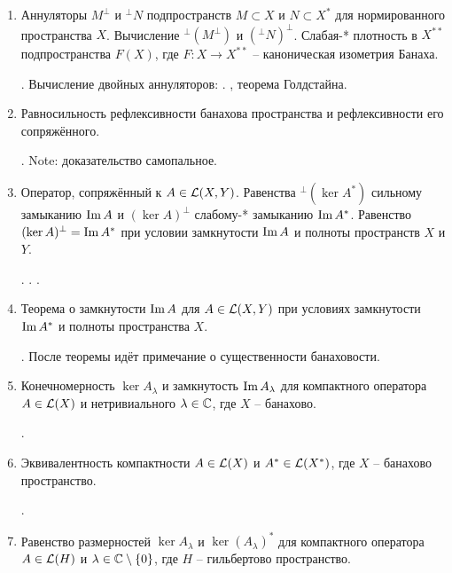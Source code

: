 \begin{enumerate}
     <<>>.

    . Note: доказательство самопальное, в лекциях есть каноническое (конец 5 лекции).

    \item Аннуляторы $M^\perp$ и ${}^\perp N$ подпространств $M \subset X$ и $N \subset X^*$ для нормированного пространства $X$. Вычисление $^\perp(M^\perp)$ и $(^\perp N)^\perp$. Слабая-* плотность в $X^{**}$ подпространства $F(X)$, где $F\colon X \to X^{**}$ -- каноническая изометрия Банаха.
    

    .
    Вычисление двойных аннуляторов: .
    , теорема Голдстайна.

    \item Равносильность рефлексивности банахова пространства и рефлексивности его сопряжённого.

    .  Note: доказательство самопальное.

    \item Оператор, сопряжённый к $A \in \mathcal{L}(X, Y)$. Равенства $^\perp (\ker A^*)$ сильному замыканию $\operatorname{Im} A$ и $(\ker A)^\perp$ слабому-* замыканию $\operatorname{Im} A^*$. Равенство $(\ker A)^\perp = \operatorname{Im} A^*$ при условии замкнутости $\operatorname{Im} A$ и полноты пространств $X$ и $Y$.
    
     . . .

    \item Теорема о замкнутости $\operatorname{Im} A$ для $A \in \mathcal{L}(X, Y)$ при условиях замкнутости $\operatorname{Im} A^*$ и полноты пространства $X$.
    
    . После теоремы идёт примечание о существенности банаховости.

    \item Конечномерность $\ker A_\lambda$ и замкнутость $\operatorname{Im} A_\lambda$ для компактного оператора $A \in \mathcal{L}(X)$ и нетривиального $\lambda \in \mathbb{C}$, где $X$ -- банахово.
    
    .

    \item Эквивалентность компактности $A \in \mathcal{L}(X)$ и $A^* \in \mathcal{L}(X^*)$, где $X$ -- банахово пространство.
    
    .

    \item Равенство размерностей $\ker A_\lambda$ и $\ker (A_\lambda)^*$ для компактного оператора $A \in \mathcal{L}(H)$ и $\lambda \in \mathbb{C} \setminus \{0\}$, где $H$ -- гильбертово пространство.
    

\end{enumerate}
